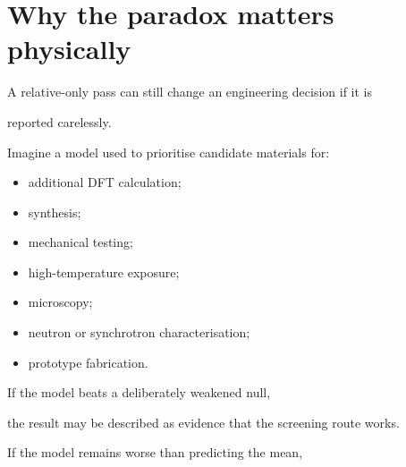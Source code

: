 \documentclass[11pt,a4paper,oneside]{report}
\begin{document}
\section{Why the paradox matters physically}



A relative-only pass can still change an engineering decision if it is

reported carelessly.



Imagine a model used to prioritise candidate materials for:



\begin{itemize}



\item

additional DFT calculation;



\item

synthesis;



\item

mechanical testing;



\item

high-temperature exposure;



\item

microscopy;



\item

neutron or synchrotron characterisation;



\item

prototype fabrication.



\end{itemize}



If the model beats a deliberately weakened null,

the result may be described as evidence that the screening route works.



If the model remains worse than predicting the mean,
\end{document}
